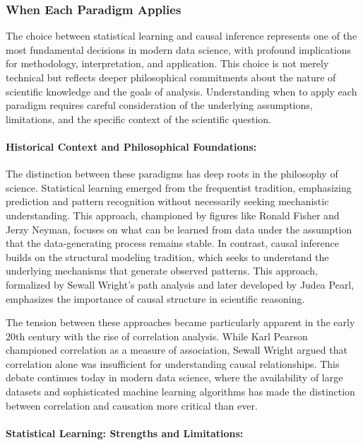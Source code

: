 \subsubsection{When Each Paradigm Applies}

The choice between statistical learning and causal inference represents one of the most fundamental decisions in modern data science, with profound implications for methodology, interpretation, and application. This choice is not merely technical but reflects deeper philosophical commitments about the nature of scientific knowledge and the goals of analysis. Understanding when to apply each paradigm requires careful consideration of the underlying assumptions, limitations, and the specific context of the scientific question.

\paragraph{Historical Context and Philosophical Foundations:}

The distinction between these paradigms has deep roots in the philosophy of science. Statistical learning emerged from the frequentist tradition, emphasizing prediction and pattern recognition without necessarily seeking mechanistic understanding. This approach, championed by figures like Ronald Fisher and Jerzy Neyman, focuses on what can be learned from data under the assumption that the data-generating process remains stable. In contrast, causal inference builds on the structural modeling tradition, which seeks to understand the underlying mechanisms that generate observed patterns. This approach, formalized by Sewall Wright's path analysis and later developed by Judea Pearl, emphasizes the importance of causal structure in scientific reasoning.

The tension between these approaches became particularly apparent in the early 20th century with the rise of correlation analysis. While Karl Pearson championed correlation as a measure of association, Sewall Wright argued that correlation alone was insufficient for understanding causal relationships. This debate continues today in modern data science, where the availability of large datasets and sophisticated machine learning algorithms has made the distinction between correlation and causation more critical than ever.

\paragraph{Statistical Learning: Strengths and Limitations:}

